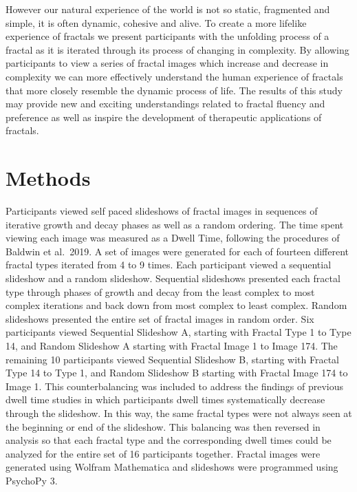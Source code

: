 \documentclass[english,jou]{apa6}
\begin{document}
However our natural experience of the world is not so static, fragmented and simple, it is often dynamic, cohesive and alive. To create a more lifelike experience of fractals we present participants with the unfolding process of a fractal as it is iterated through its process of changing in complexity. By allowing participants to view a series of fractal images which increase and decrease in complexity we can more effectively understand the human experience of fractals that more closely resemble the dynamic process of life. The results of this study may provide new and exciting understandings related to fractal fluency and preference as well as inspire the development of therapeutic applications of fractals.

\hypertarget{methods}{%
\section{Methods}\label{methods}}

Participants viewed self paced slideshows of fractal images in sequences of iterative growth and decay phases as well as a random ordering. The time spent viewing each image was measured as a Dwell Time, following the procedures of Baldwin et al.~2019. A set of images were generated for each of fourteen different fractal types iterated from 4 to 9 times. Each participant viewed a sequential slideshow and a random slideshow. Sequential slideshows presented each fractal type through phases of growth and decay from the least complex to most complex iterations and back down from most complex to least complex. Random slideshows presented the entire set of fractal images in random order. Six participants viewed Sequential Slideshow A, starting with Fractal Type 1 to Type 14, and Random Slideshow A starting with Fractal Image 1 to Image 174. The remaining 10 participants viewed Sequential Slideshow B, starting with Fractal Type 14 to Type 1, and Random Slideshow B starting with Fractal Image 174 to Image 1. This counterbalancing was included to address the findings of previous dwell time studies in which participants dwell times systematically decrease through the slideshow. In this way, the same fractal types were not always seen at the beginning or end of the slideshow. This balancing was then reversed in analysis so that each fractal type and the corresponding dwell times could be analyzed for the entire set of 16 participants together. Fractal images were generated using Wolfram Mathematica and slideshows were programmed using PsychoPy 3.
\end{document}
